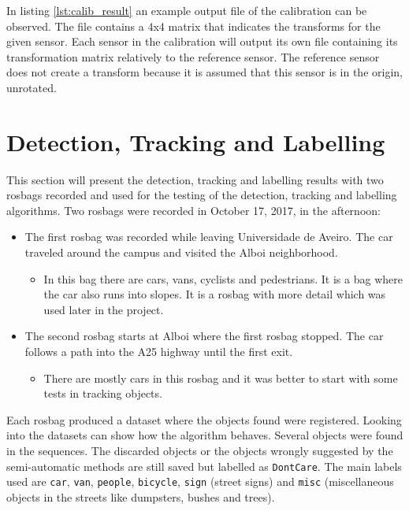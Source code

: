 In listing \ref{lst:calib_result} an example output file of the calibration can be observed. The file contains a 4x4 matrix that indicates the transforms for the given sensor. Each sensor in the calibration will output its own file containing its transformation matrix relatively to the reference sensor. The reference sensor does not create a transform because it is assumed that this sensor is in the origin, unrotated. 

\section{Detection, Tracking and Labelling}

This section will present the detection, tracking and labelling results with two rosbags recorded and used for the testing of the detection, tracking and labelling algorithms. Two rosbags were recorded in October 17, 2017, in the afternoon:

\begin{itemize}
	\item The first rosbag was recorded while leaving Universidade de Aveiro. The car traveled around the campus and visited the Alboi neighborhood.
	\begin{itemize}
	\item In this bag there are cars, vans, cyclists and pedestrians. It is a bag where the car also runs into slopes. It is a rosbag with more detail which was used later in the project.
	\end{itemize} 
	\item The second rosbag starts at Alboi where the first rosbag stopped. The car follows a path into the A25 highway until the first exit.
	\begin{itemize}
	\item There are mostly cars in this rosbag and it was better to start with some tests in tracking objects.
	\end{itemize} 
\end{itemize} 


Each rosbag produced a dataset where the objects found were registered. Looking into the datasets can show how the algorithm behaves. Several objects were found in the sequences. The discarded objects or the objects wrongly suggested by the semi-automatic methods are still saved but labelled as \texttt{DontCare}. The main labels used are \texttt{car}, \texttt{van}, \texttt{people}, \texttt{bicycle}, \texttt{sign} (street signs) and \texttt{misc} (miscellaneous objects in the streets like dumpsters, bushes and trees).

